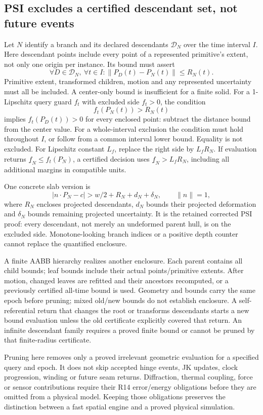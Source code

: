 \subsection{PSI excludes a certified descendant set, not future events}
Let $N$ identify a branch and its declared descendants $\mathcal D_N$ over
the time interval $I$. Here descendant points include every point of a
represented primitive's extent, not only one origin per instance. Its bound
must assert
\begin{equation}
 \forall D\in\mathcal D_N,\ \forall t\in I:
       \|P_D(t)-P_N(t)\|\le R_N(t).
 \label{eq:r15-descendant-bound}
\end{equation}
Primitive extent, transformed children, motion and any represented uncertainty
must all be included. A center-only bound is insufficient for a finite solid.
For a 1-Lipschitz query guard $f_t$ with excluded side $f_t>0$, the condition
\begin{equation}
 f_t(P_N(t))>R_N(t)
 \label{eq:r15-psi}
\end{equation}
implies $f_t(P_D(t))>0$ for every enclosed point: subtract the distance bound
from the center value. For a whole-interval exclusion the condition must hold
throughout $I$, or follow from a common interval lower bound. Equality is not
excluded. For Lipschitz constant $L_f$, replace the right side by $L_fR_N$.
If evaluation returns $\underline f_N\le f_t(P_N)$, a certified decision
uses $\underline f_N>L_fR_N$, including all additional margins in compatible
units.

One concrete slab version is
\begin{equation}
 |n\cdot P_N-c|>w/2+R_N+d_N+\delta_N,\qquad \|n\|=1,
 \label{eq:r15-psi-slab}
\end{equation}
where $R_N$ encloses projected descendants, $d_N$ bounds their projected
deformation and $\delta_N$ bounds remaining projected uncertainty. It is the
retained corrected PSI proof: every descendant, not merely an undeformed
parent hull, is on the excluded side. Monotone-looking branch indices or a
positive depth counter cannot replace the quantified enclosure.

A finite AABB hierarchy realizes another enclosure. Each parent contains all
child bounds; leaf bounds include their actual points/primitive extents.
After motion, changed leaves are refitted and their ancestors recomputed, or
a previously certified all-time bound is used. Geometry and bounds carry the
same epoch before pruning; mixed old/new bounds do not establish enclosure.
A self-referential return that changes the root or transforms descendants
starts a new bound evaluation unless the old certificate explicitly covered
that return. An infinite descendant family requires a proved finite bound or
cannot be pruned by that finite-radius certificate.

Pruning here removes only a proved irrelevant geometric evaluation for a
specified query and epoch. It does not skip accepted hinge events, JK updates,
clock progression, winding or future seam returns. Diffraction, thermal
coupling, force or sensor contributions require their R14 error/energy
obligations before they are omitted from a physical model. Keeping those
obligations preserves the distinction between a fast spatial engine and a
proved physical simulation.
